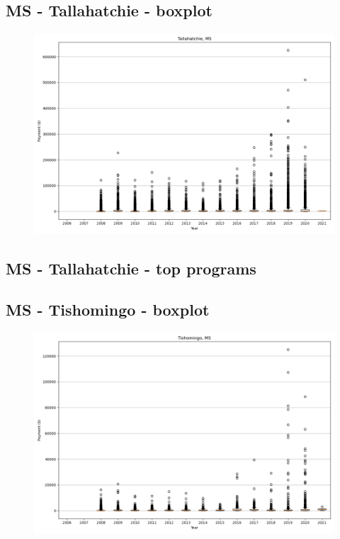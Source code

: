 \subsection*{MS - Tallahatchie - boxplot}
\begin{figure}[h]
\centering
\includegraphics[width=7in]{../output/boxplots/counties/Tallahatchie-MS_boxplot.png}
\end{figure}


\subsection*{MS - Tallahatchie - top programs}

\newpage
\subsection*{MS - Tishomingo - boxplot}
\begin{figure}[h]
\centering
\includegraphics[width=7in]{../output/boxplots/counties/Tishomingo-MS_boxplot.png}
\end{figure}


